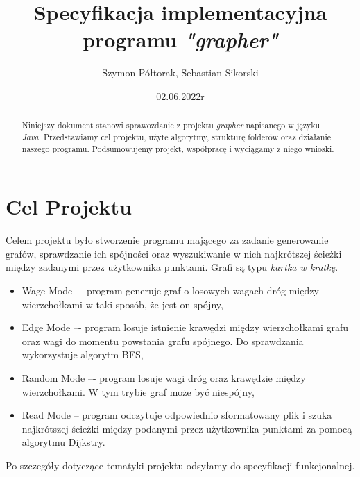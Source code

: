 \documentclass[10pt, a4paper]{report}
\title{\huge{\textbf{Specyfikacja implementacyjna} \\ programu \textit{"grapher"}}}
\author{Szymon Półtorak, Sebastian Sikorski}
\date{02.06.2022r}
\begin{document}
\maketitle
\lstset{style=listings}

\begin{abstract}
    Niniejszy dokument stanowi sprawozdanie z projektu \textit{grapher} napisanego w języku \textit{Java}.
     Przedstawiamy cel projektu, użyte algorytmy, strukturę folderów oraz działanie naszego programu. Podsumowujemy projekt, współpracę i wyciągamy z niego wnioski.
\end{abstract}


\renewcommand*\thesection{\arabic{section}} 

\pagestyle{fancy}
\fancyhf{}

\tableofcontents
\newpage

\section{Cel Projektu}\label{sec:cel-projektu}
Celem projektu było stworzenie programu mającego za zadanie generowanie grafów, sprawdzanie ich spójności oraz wyszukiwanie w nich najkrótszej ścieżki między zadanymi przez użytkownika punktami. 
Grafi są typu \textit{kartka w kratkę}.
    \begin{itemize}
        \item Wage Mode –- program generuje graf o losowych wagach dróg między wierzchołkami w taki sposób, że jest on spójny,
        \item Edge Mode –- program losuje istnienie krawędzi między wierzchołkami grafu oraz wagi do momentu powstania
        grafu spójnego. Do sprawdzania wykorzystuje algorytm BFS,
        \item Random Mode –- program losuje wagi dróg oraz krawędzie między wierzchołkami. W tym trybie graf może być niespójny,
        \item Read Mode -- program odczytuje odpowiednio sformatowany plik i szuka najkrótszej ścieżki
        między podanymi przez użytkownika punktami za pomocą algorytmu Dijkstry.
    \end{itemize}
    Po szczegóły dotyczące tematyki projektu odsyłamy do specyfikacji funkcjonalnej.
\end{document}

